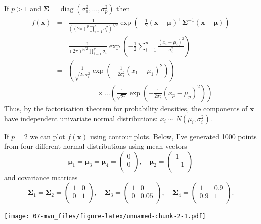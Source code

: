 \documentclass[]{book}
\theoremstyle{definition}
\theoremstyle{definition}
\theoremstyle{definition}
\theoremstyle{remark}
\begin{document}
If \(p>1\) and \(\boldsymbol{\Sigma}= \operatorname{diag}(\sigma_1^2, \ldots, \sigma_p^2)\) then
\begin{eqnarray*}
f(\mathbf x) &=& \frac{1}{((2 \pi)^{p}\prod_{i=1}^p \sigma_i^2)^{1/2}} \exp \left(-\frac{1}{2}(\mathbf x- {\boldsymbol{\mu}})^\top \boldsymbol{\Sigma}^{-1}(\mathbf x- {\boldsymbol{\mu}}) \right)\\
&=& \frac{1}{(2 \pi)^{p/2}\prod_{i=1}^p \sigma_i} \exp \left(-\frac{1}{2} \sum_{i=1}^p \frac{(x_i - \mu_i)^2}{\sigma_i^2} \right)\\
&=& \left(\frac{1}{\sqrt{2 \pi\sigma_i^2}} \exp \left(-\frac{1}{2\sigma_1^2} (x_1 - \mu_1)^2 \right)\right)\\
 && \qquad \qquad \times \ldots \left(\frac{1}{\sqrt{2 \pi}} \exp \left(-\frac{1}{2\sigma_p^2} (x_p - \mu_p)^2 \right)\right)
\end{eqnarray*}
Thus, by the factorisation theorem for probability densities, the components of \(\mathbf x\) have independent univariate normal distributions: \(x_i \sim N(\mu_i, \sigma_i^2)\).

If \(p=2\) we can plot \(f(\mathbf x)\) using contour plots. Below, I've generated 1000 points from four different normal distributions using mean vectors
\[{\boldsymbol{\mu}}_1={\boldsymbol{\mu}}_3={\boldsymbol{\mu}}_4=\begin{pmatrix}0 \\0 \\\end{pmatrix}, \quad {\boldsymbol{\mu}}_2=\begin{pmatrix}1 \\-1 \\\end{pmatrix}\]
and covariance matrices
\[\boldsymbol{\Sigma}_1=\boldsymbol{\Sigma}_2=\begin{pmatrix}1&0 \\0&1 \\\end{pmatrix}, \quad \boldsymbol{\Sigma}_3=\begin{pmatrix}1&0 \\0&0.05 \\\end{pmatrix}, \quad \boldsymbol{\Sigma}_4=\begin{pmatrix}1&0.9 \\0.9&1 \\\end{pmatrix}.\]

\texttt{[image: 07-mvn\_files/figure-latex/unnamed-chunk-2-1.pdf]}
\end{document}
